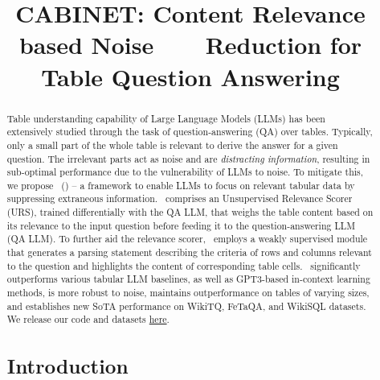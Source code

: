 \title{CABINET: Content Relevance based Noise\ \ \ \ Reduction for Table Question Answering}



\def \approach{ToReQA }

\maketitle

\def\thefootnote{*}\def\thefootnote{\arabic{footnote}}

\begin{abstract}

Table understanding capability of Large Language Models (LLMs) has been extensively studied through the task of question-answering (QA) over tables. Typically, only a small part of the whole table is relevant to derive the answer for a given question. The irrelevant parts act as noise and are \textit{distracting information}, resulting in sub-optimal performance due to the vulnerability of LLMs to noise. To mitigate this, we propose \textbf{\approachname}\ (\approachtext) -- a framework to enable LLMs to focus on relevant tabular data by suppressing extraneous information. \approachname\ comprises an Unsupervised Relevance Scorer (URS), trained differentially with the QA LLM, that weighs the table content based on its relevance to the input question before feeding it to the question-answering LLM (QA LLM). To further aid the relevance scorer, \approachname\ employs a weakly supervised module that generates a parsing statement describing the criteria of rows and columns relevant to the question and highlights the content of corresponding table cells. \approachname\ significantly outperforms various tabular LLM baselines, as well as GPT3-based in-context learning methods, is more robust to noise, maintains outperformance on tables of varying sizes, and establishes new SoTA performance on WikiTQ, FeTaQA, and WikiSQL datasets. We release our code and datasets \href{https://github.com/Sohanpatnaik106/CABINET_QA}{here}.
\vspace{-2mm}

\vspace{-2mm}
\section{Introduction}
\vspace{-1mm}


\end{abstract}
